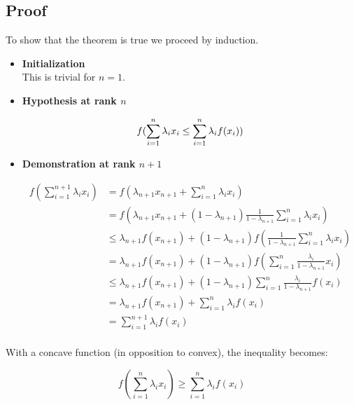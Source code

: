 \subsection{Proof}
To show that the theorem is true we proceed by induction.\\
\begin{itemize}
\item \textbf{Initialization}\\
This is trivial for $n=1$.\\
\item \textbf{Hypothesis at rank $n$} 

 \begin{equation*}
  f(\sum_{i=1}^n \lambda_i x_i \leq \sum_{i=1}^n \lambda_i f(x_i))\\
  \end{equation*}

\item \textbf{Demonstration at rank $n+1$}

 \begin{align*}
  f(\sum_{i=1}^{n+1} \lambda_i x_i ) &= f(\lambda_{n+1} x_{n+1} + \sum_{i=1}^n \lambda_i x_i)\\
                                     &= f(\lambda_{n+1} x_{n+1} + (1-\lambda_{n+1})\frac{1}{1-\lambda_{n+1}}\sum_{i=1}^n \lambda_i x_i)\\
                                     &\leq \lambda_{n+1} f(x_{n+1}) + (1-\lambda_{n+1})f(\frac{1}{1-\lambda_{n+1}}\sum_{i=1}^n \lambda_i x_i)\\
                                     &= \lambda_{n+1} f(x_{n+1}) + (1-\lambda_{n+1})f(\sum_{i=1}^n \frac{\lambda_i}{1-\lambda_{n+1}} x_i)\\
                                     &\leq \lambda_{n+1} f(x_{n+1}) + (1-\lambda_{n+1})\sum_{i=1}^n \frac{\lambda_i}{1-\lambda_{n+1}} f(x_i)\\
                                     &= \lambda_{n+1} f(x_{n+1}) + \sum_{i=1}^n \lambda_i f(x_i)\\
                                     &= \sum_{i=1}^{n+1} \lambda_i f(x_i)\\      
  \end{align*}
\end{itemize}

With a concave function (in opposition to convex), the inequality becomes:

 \begin{equation*}
  f(\sum_{i=1}^n \lambda_i x_i) \geq \sum_{i=1}^n \lambda_i f(x_i)
  \end{equation*}
